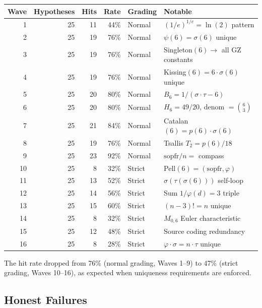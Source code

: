 \documentclass[11pt,a4paper]{article}
\begin{document}
\begin{center}
\begin{tabular}{rrrrll}
\toprule
Wave & Hypotheses & Hits & Rate & Grading & Notable \\
\midrule
1  & 25 & 11 & 44\% & Normal & $(1/e)^{1/e} = \ln(2)$ pattern \\
2  & 25 & 19 & 76\% & Normal & $\psi(6) = \sigma(6)$ unique \\
3  & 25 & 19 & 76\% & Normal & Singleton$(6) \to$ all GZ constants \\
4  & 25 & 19 & 76\% & Normal & Kissing$(6) = 6 \cdot \sigma(6)$ unique \\
5  & 25 & 20 & 80\% & Normal & $B_6 = 1/(\sigma\cdot\tau - 6)$ \\
6  & 25 & 20 & 80\% & Normal & $H_6 = 49/20$, denom $= \binom{6}{3}$ \\
7  & 25 & 21 & 84\% & Normal & Catalan$(6) = p(6)\cdot\sigma(6)$ \\
8  & 25 & 19 & 76\% & Normal & Tsallis $T_2 = p(6)/18$ \\
9  & 25 & 23 & 92\% & Normal & $\mathrm{sopfr}/n = $ compass \\
10 & 25 & 8  & 32\% & Strict  & Pell$(6) = (\mathrm{sopfr}, \varphi)$ \\
11 & 25 & 13 & 52\% & Strict  & $\sigma(\tau(\sigma(6)))$ self-loop \\
12 & 25 & 14 & 56\% & Strict  & Sum $1/\varphi(d) = 3$ triple \\
13 & 25 & 15 & 60\% & Strict  & $(n-3)! = n$ unique \\
14 & 25 & 8  & 32\% & Strict  & $M_{0,6}$ Euler characteristic \\
15 & 25 & 12 & 48\% & Strict  & Source coding redundancy \\
16 & 25 & 8  & 28\% & Strict  & $\varphi\cdot\sigma = n\cdot\tau$ unique \\
\bottomrule
\end{tabular}
\end{center}

The hit rate dropped from 76\% (normal grading, Waves 1--9) to 47\% (strict grading, Waves 10--16), as expected when uniqueness requirements are enforced.

\subsection{Honest Failures}
\end{document}
